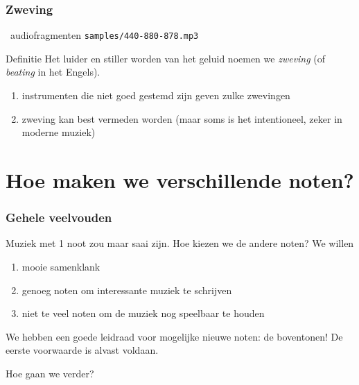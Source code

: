 \documentclass[compress, darktitle, framenumber, totalframenumber]{beamer}
\begin{document}
\begin{frame}
  \frametitle{Zweving}

  \begin{block}{\twonotes\ audiofragmenten}
    \texttt{samples/440-880-878.mp3} \\
  \end{block}

  \pause

  \begin{alertblock}{Definitie}
    Het luider en stiller worden van het geluid noemen we \emph{zweving} (of \emph{beating} in het Engels).
  \end{alertblock}

  \begin{enumerate}
    \item instrumenten die niet goed gestemd zijn geven zulke zwevingen
    \item zweving kan best vermeden worden (maar soms is het intentioneel, zeker in moderne muziek)
  \end{enumerate}
\end{frame}

\section{Hoe maken we verschillende noten?}

\begin{frame}
  \frametitle{Gehele veelvouden}

  Muziek met 1 noot zou maar saai zijn. Hoe kiezen we de andere noten? \pause We willen
  \begin{enumerate}
    \item mooie samenklank
    \item \pause genoeg noten om interessante muziek te schrijven
    \item \pause niet te veel noten om de muziek nog speelbaar te houden
  \end{enumerate}

  We hebben een goede leidraad voor mogelijke nieuwe noten: de \alert{boventonen}! De eerste voorwaarde is alvast voldaan.

  Hoe gaan we verder?
\end{frame}
\end{document}
